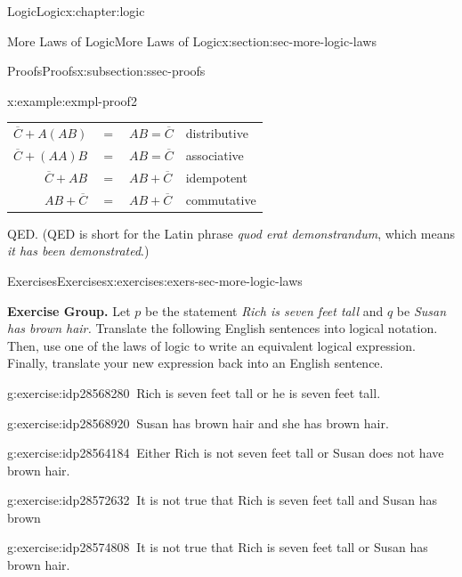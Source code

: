 \documentclass[twoside,10pt,]{book}
\numberwithin{equation}{section}
\begin{document}
\begin{chapterptx}{Logic}{}{Logic}{}{}{x:chapter:logic}
\begin{sectionptx}{More Laws of Logic}{}{More Laws of Logic}{}{}{x:section:sec-more-logic-laws}
\begin{subsectionptx}{Proofs}{}{Proofs}{}{}{x:subsection:ssec-proofs}
\begin{example}{}{x:example:exmpl-proof2}
\begin{center}
{\begin{tabular}{llll}
\multicolumn{1}{r}{\(\overline{C}+A(AB)\)}&\(=\)&\(AB=\overline{C}\)&distributive\tabularnewline[0pt]
\multicolumn{1}{r}{\(\overline{C}+(AA)B\)}&\(=\)&\(AB=\overline{C}\)&associative\tabularnewline[0pt]
\multicolumn{1}{r}{\(\overline{C}+AB\)}&\(=\)&\(AB+\overline{C}\)&idempotent\tabularnewline[0pt]
\multicolumn{1}{r}{\(AB+\overline{C}\)}&\(=\)&\(AB+\overline{C}\)&commutative
\end{tabular}
}%
\end{center}%
 QED.  (QED is short for the Latin phrase \emph{quod erat demonstrandum}, which means \emph{it has been demonstrated}.)\end{example}
\end{subsectionptx}
%
%
\typeout{************************************************}
\typeout{************************************************}
%
\begin{exercises-subsection}{Exercises}{}{Exercises}{}{}{x:exercises:exers-sec-more-logic-laws}
\par\medskip\noindent%
\textbf{Exercise Group.}\space\space%
Let \(p\) be the statement \emph{Rich is seven feet tall} and \(q\) be \emph{Susan has brown hair.}  Translate the following English sentences into logical notation.  Then, use one of the laws of logic to write an equivalent logical expression.  Finally, translate your new expression back into an English sentence.\begin{exercisegroup}
\begin{divisionexerciseeg}{1}{}{}{g:exercise:idp28568280}%
\(\ \)Rich is seven feet tall or he is seven feet tall.\end{divisionexerciseeg}%
\begin{divisionexerciseeg}{2}{}{}{g:exercise:idp28568920}%
\(\ \)Susan has brown hair and she has brown hair.\end{divisionexerciseeg}%
\begin{divisionexerciseeg}{3}{}{}{g:exercise:idp28564184}%
\(\ \)Either Rich is not seven feet tall or Susan does not have brown hair.\end{divisionexerciseeg}%
\begin{divisionexerciseeg}{4}{}{}{g:exercise:idp28572632}%
\(\ \)It is not true that Rich is seven feet tall and Susan has brown\end{divisionexerciseeg}%
\begin{divisionexerciseeg}{5}{}{}{g:exercise:idp28574808}%
\(\ \)It is not true that Rich is seven feet tall or Susan has brown hair.\end{divisionexerciseeg}%

\end{exercisegroup}
\end{exercises-subsection}
\end{sectionptx}
\end{chapterptx}
\end{document}
